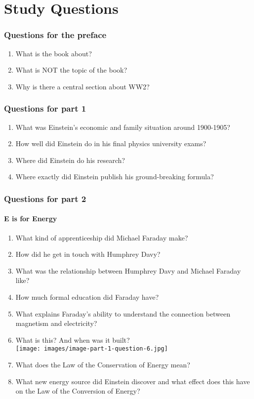 %

\chapter{Study Questions}

\subsection*{Questions for the preface}
\begin{enumerate}  
\item What is the book about?  
\item What is NOT the topic of the book?
\item Why is there a central section about WW2?
\end{enumerate}

\subsection*{Questions for part 1}
\begin{enumerate}  
\item What was Einstein's economic and family situation around 1900-1905? 
\item How well did Einstein do in his final physics university exams?
\item Where did Einstein do his research?
\item Where exactly did Einstein publish his ground-breaking formula?
\end{enumerate}

\subsection*{Questions for part 2}
\subsubsection*{E is for Energy}
\begin{enumerate}  
\item What kind of apprenticeship did Michael Faraday make?
\item How did he get in touch with Humphrey Davy?
\item What was the relationship between Humphrey Davy and Michael Faraday like?
\item How much formal education did Faraday have?
\item What explains Faraday's ability to understand the connection between magnetism and electricity?
\item What is this? And when was it built? \\
\texttt{[image: images/image-part-1-question-6.jpg]}\par\vspace{1cm}
\item What does the Law of the Conservation of Energy mean?
\item What new energy source did Einstein discover and what effect does this have on the Law of the Conversion of Energy?
\end{enumerate}

